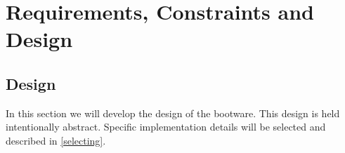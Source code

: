 \chapter{Requirements, Constraints and Design}




\section{Design}

In this section we will develop the design of the bootware.
This design is held intentionally abstract.
Specific implementation details will be selected and described in \autoref{selecting}.





